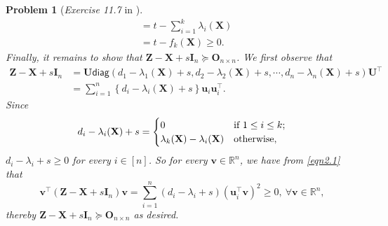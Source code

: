 \documentclass[11pt]{article}
\newtheorem{problem}{Problem}
\numberwithin{equation}{problem}
\begin{document}
\begin{problem} [\emph{Exercise 11.7} in \cite{calafiore2014optimization}]
{\begin{equation*}
\begin{split}
        &= t - \sum_{i=1}^{k} \lambda_i (\mathbf{X}) \\
        &= t - f_k (\mathbf{X}) \geq 0.
    \end{split}
\end{equation*}
\noindent Finally, it remains to show that $\mathbf{Z} - \mathbf{X} + s \mathbf{I}_n \succeq \mathbf{O}_{n \times n}$. We first observe that
\begin{equation}
    \label{eqn2.1}
    \begin{split}
        \mathbf{Z} - \mathbf{X} + s \mathbf{I}_n
        &= \mathbf{U} \textsf{diag} \left( d_1 - \lambda_1 (\mathbf{X}) + s, d_2 - \lambda_2 (\mathbf{X}) + s, \cdots, d_n - \lambda_n (\mathbf{X}) + s \right) \mathbf{U}^{\top} \\
        &= \sum_{i=1}^{n} \left\{ d_i - \lambda_i (\mathbf{X}) + s \right\} \mathbf{u}_i \mathbf{u}_{i}^{\top}.
    \end{split}
\end{equation}
Since
\begin{equation*}
    d_i - \lambda_i (\mathbf{X}) + s =
    \begin{cases}
        0 & \textnormal{if } 1 \leq i \leq k; \\
        \lambda_k (\mathbf{X}) - \lambda_i (\mathbf{X}) & \textnormal{otherwise,}
    \end{cases}
\end{equation*}
$d_i - \lambda_i + s \geq 0$ for every $i \in [n]$. So for every $\mathbf{v} \in \mathbb{R}^n$, we have from \eqref{eqn2.1} that
\begin{equation*}
    \mathbf{v}^{\top} \left( \mathbf{Z} - \mathbf{X} + s \mathbf{I}_n \right) \mathbf{v}
    = \sum_{i=1}^{n} \left( d_i - \lambda_i + s \right) \left( \mathbf{u}_{i}^{\top} \mathbf{v} \right)^2 \geq 0,\ \forall \mathbf{v} \in \mathbb{R}^n,
\end{equation*}
thereby $\mathbf{Z} - \mathbf{X} + s \mathbf{I}_n \succeq \mathbf{O}_{n \times n}$ as desired.
\medskip

}
\end{problem}
\end{document}
